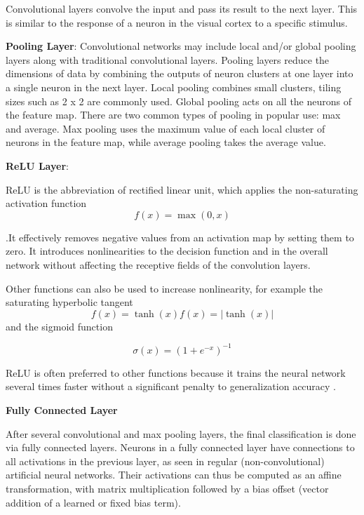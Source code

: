 \documentclass[10pt]{report}
\begin{document}
	Convolutional layers convolve the input and pass its result to the next
	layer. This is similar to the response of a neuron in the visual cortex to a
	specific stimulus.

	\textbf{Pooling Layer}:
	Convolutional networks may include local and/or global pooling layers along
	with traditional convolutional layers. Pooling layers reduce the dimensions
	of data by combining the outputs of neuron clusters at one layer into a
	single neuron in the next layer. Local pooling combines small clusters,
	tiling sizes such as 2 x 2 are commonly used. Global pooling acts on all the
	neurons of the feature map. There are two common types of pooling in popular
	use: max and average. Max pooling uses the maximum value of each local
	cluster of neurons in the feature map, while average pooling takes the
	average value.

	\textbf{ReLU Layer}:

	ReLU is the abbreviation of rectified linear unit, which applies the
	non-saturating activation function
	\begin{equation}
		f ( x ) = \max ( 0 , x )
	\end{equation}

	.It effectively removes
	negative values from an activation map by setting them to zero. It
	introduces nonlinearities to the decision function and in the overall
	network without affecting the receptive fields of the convolution layers.

	Other functions can also be used to increase nonlinearity, for example the
	saturating hyperbolic tangent
	\begin{equation}
	f(x)=\tanh(x)
	f(x) = | \tanh (x) |
	\end{equation}
	and the
	sigmoid function

	\begin{equation}
		\sigma(x) = (1+e^{-x})^{-1}
	\end{equation}

	ReLU is often preferred to other functions because it trains the neural network several
	times faster without a significant penalty to generalization accuracy
	 \cite{relu_layer}.

	\textbf{Fully Connected Layer}

	After several convolutional and max pooling layers, the final classification
	is done via fully connected layers. Neurons in a fully connected layer have
	connections to all activations in the previous layer, as seen in regular
	(non-convolutional) artificial neural networks. Their activations can thus
	be computed as an affine transformation, with matrix multiplication followed
	by a bias offset (vector addition of a learned or fixed bias term).
\end{document}
